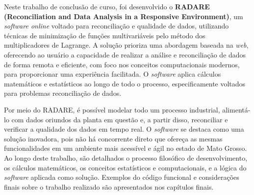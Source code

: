 %
%


Neste trabalho de conclusão de curso, foi desenvolvido o \textbf{RADARE (Reconciliation and Data Analysis in a Responsive Environment)}, um \textit{software online} voltado para reconciliação e qualidade de dados, utilizando técnicas de minimização de funções multivariáveis pelo método dos multiplicadores de Lagrange. A solução prioriza uma abordagem baseada na \textit{web}, oferecendo ao usuário a capacidade de realizar a análise e reconciliação de dados de forma remota e eficiente, com foco nos conceitos computacionais modernos, para proporcionar uma experiência facilitada. O \textit{software} aplica cálculos matemáticos e estatísticos ao longo de todo o processo, especificamente voltados para problemas reconciliação de dados.

Por meio do RADARE, é possível modelar todo um processo industrial, alimentá-lo com dados oriundos da planta em questão e, a partir disso, reconciliar e verificar a qualidade dos dados em tempo real. O \textit{software} se destaca como uma solução inovadora, pois não há concorrente direto que ofereça as mesmas funcionalidades em um ambiente mais acessível e ágil no estado de Mato Grosso. Ao longo deste trabalho, são detalhados o processo filosófico de desenvolvimento, os cálculos matemáticos, os conceitos estatísticos e computacionais, e a lógica do \textit{software} aplicada como solução. Exemplos do código funcional e considerações finais sobre o trabalho realizado são apresentados nos capítulos finais.


